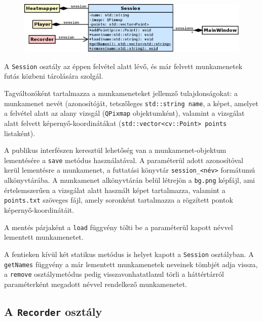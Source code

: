 \begin{figure}[!ht]
\centering
\includegraphics[width=140mm, keepaspectratio]{figures/class_session.png}
\end{figure}

A \texttt{Session} osztály az éppen felvétel alatt lévő, és már felvett munkamenetek futás közbeni tárolására szolgál.

Tagváltozóként tartalmazza a munkameneteket jellemző tulajdonságokat: a munkamenet nevét (azonosítóját, tetszőleges \texttt{std::string name}, a képet, amelyet a felvétel alatt az alany vizsgál (\texttt{QPixmap} objektumként), valamint a vizsgálat alatt felvett képernyő-koordinátákat (\texttt{std::vector<cv::Point> points} listaként).

\bigskip

A publikus interfészen keresztül lehetőség van a munkamenet-objektum lementésére a \texttt{save} metódus használatával. A paraméterül adott azonosítóval kerül lementésre a munkamenet, a futtatási könyvtár \texttt{session\_<név>} formátumú alkönyvtárába. A munkamenet alkönyvtárán belül létrejön a \texttt{bg.png} képfájl, ami értelemszerűen a vizsgálat alatt használt képet tartalmazza, valamint a \texttt{points.txt} szöveges fájl, amely  soronként tartalmazza a rögzített pontok képernyő-koordinátáit.

A mentés párjaként a \texttt{load} függvény tölti be a paraméterül kapott névvel lementett munkamenetet.

\bigskip

A fentieken kívül két statikus metódus is helyet kapott a \texttt{Session} osztályban. A \texttt{getNames} függvény a már lementett munkamenetek neveinek tömbjét adja vissza, a \texttt{remove} osztálymetódus pedig visszavonhatatlanul törli a háttértárról paraméterként megadott névvel rendelkező munkamenetet.

\subsection{A \texttt{Recorder} osztály}\label{sect:recorder}

